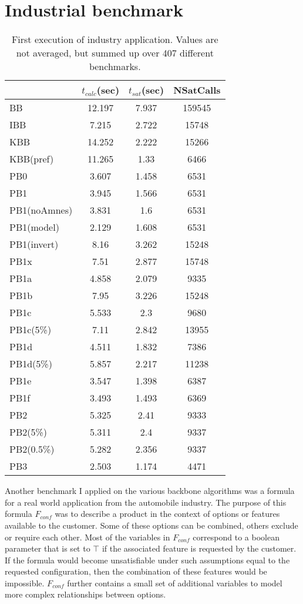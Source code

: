 \section{Industrial benchmark}


\begin{wraptable}{R}{8cm}
\begin{tabular}{l| c c c }
&	$t_{calc}$(sec) &	$t_{sat}$(sec)	& NSatCalls \\
\hline
BB & 12.197 & 7.937 & 159545 \\
IBB & 7.215 & 2.722 & 15748 \\
KBB & 14.252 & 2.222 & 15266 \\
KBB(pref) & 11.265 & 1.33 & 6466 \\
PB0 & 3.607 & 1.458 & 6531 \\
PB1 & 3.945 & 1.566 & 6531 \\
PB1(noAmnes) & 3.831 & 1.6 & 6531 \\
PB1(model) & 2.129 & 1.608 & 6531 \\
PB1(invert) & 8.16 & 3.262 & 15248 \\
PB1x & 7.51 & 2.877 & 15748 \\
PB1a & 4.858 & 2.079 & 9335 \\
PB1b & 7.95 & 3.226 & 15248 \\
PB1c & 5.533 & 2.3 & 9680 \\
PB1c(5\%) & 7.11 & 2.842 & 13955 \\
PB1d & 4.511 & 1.832 & 7386 \\
PB1d(5\%) & 5.857 & 2.217 & 11238 \\
PB1e & 3.547 & 1.398 & 6387 \\
PB1f & 3.493 & 1.493 & 6369 \\
PB2 & 5.325 & 2.41 & 9333 \\
PB2(5\%) & 5.311 & 2.4 & 9337 \\
PB2(0.5\%) & 5.282 & 2.356 & 9337 \\
PB3 & 2.503 & 1.174 & 4471
\end{tabular}
\caption{First execution of industry application. Values are not averaged, but summed up over 407 different benchmarks.}
\label{tab:vonThore1} %
\end{wraptable}

Another benchmark I applied on the various backbone algorithms was a formula for a real world application from the automobile industry. The purpose of this formula $F_{conf}$ was to describe a product in the context of options or features available to the customer. Some of these options can be combined, others exclude or require each other. Most of the variables in $F_{conf}$ correspond to a boolean parameter that is set to $\top$ if the associated feature is requested by the customer. If the formula would become unsatisfiable under such assumptions equal to the requested configuration, then the combination of these features would be impossible. $F_{conf}$ further contains a small set of additional variables to model more complex relationships between options.


